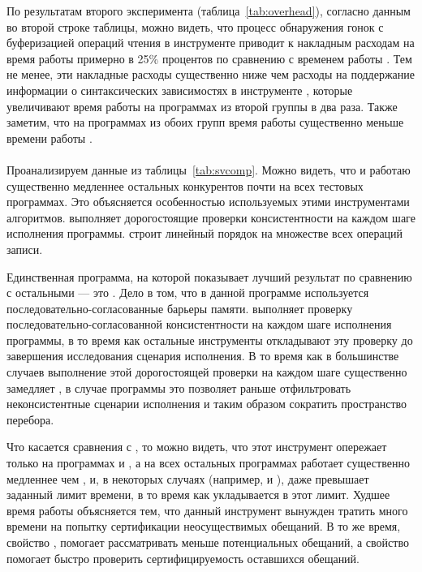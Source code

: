 По результатам второго эксперимента (таблица~\ref{tab:overhead}), 
согласно данным во второй строке таблицы, можно видеть, что
процесс обнаружения гонок с буферизацией операций чтения 
в инструменте \wmc приводит к накладным расходам на время работы 
примерно в 25\% процентов по сравнению с временем работы \genmc.
Тем не менее, эти накладные расходы существенно ниже чем 
расходы на поддержание информации о синтаксических зависимостях
в инструменте \hmc, которые увеличивают время работы \hmc
на программах из второй группы в два раза.  
Также заметим, что на программах из обоих групп
время работы \wmc существенно меньше времени работы \hmc. 

\paragraph{}
Проанализируем данные из таблицы~\ref{tab:svcomp}. 
Можно видеть, что \Nidhugg и \rmem работаю существенно медленнее остальных 
конкурентов почти на всех тестовых программах. 
Это объясняется особенностью используемых этими инструментами алгоритмов.
\Nidhugg выполняет дорогостоящие проверки консистентности
на каждом шаге исполнения программы.
\rmem строит линейный порядок на множестве всех операций записи.

Единственная программа, на которой \Nidhugg показывает 
лучший результат по сравнению с остальными --- это .
Дело в том, что в данной программе используется 
последовательно-согласованные барьеры памяти.
\Nidhugg выполняет проверку последовательно-согласованной
консистентности на каждом шаге исполнения программы, в то время 
как остальные инструменты откладывают эту проверку 
до завершения исследования сценария исполнения. 
В то время как в большинстве случаев выполнение этой дорогостоящей проверки 
на каждом шаге существенно замедляет \Nidhugg, 
в случае программы  это позволяет 
раньше отфильтровать неконсистентные сценарии исполнения 
и таким образом сократить пространство перебора. 

Что касается сравнения с \CDSChecker, то можно видеть,
что этот инструмент опережает \wmc только 
на программах  и , 
а на всех остальных программах \CDSChecker работает существенно 
медленнее чем \wmc, и, в некоторых случаях 
(например,  и ), 
даже превышает заданный лимит времени, в то время как 
\wmc укладывается в этот лимит.
Худшее время работы \CDSChecker объясняется тем, что 
данный инструмент вынужден тратить много времени 
на попытку сертификации неосуществимых обещаний. 
В то же время, свойство \LBRF, помогает \wmc 
рассматривать меньше потенциальных обещаний, 
а свойство \CL помогает быстро проверить 
сертифицируемость оставшихся обещаний.  


